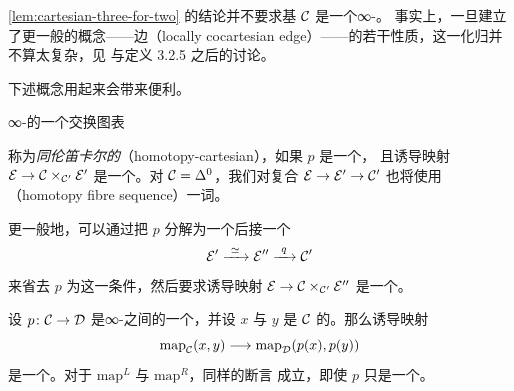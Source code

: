 \begin{remark}\label{rem:cartesian-three-for-two-base}
\cref{lem:cartesian-three-for-two} 的结论并不要求基 $\mathcal{C}$ 是一个∞-\trCategory{}。
事实上，一旦建立了更一般的概念——\trLocallyCocartesian{}边（locally
cocartesian edge）——的若干性质，这一化归并不算太复杂，见 \cite[2.4.2]{Lur09} 与定义 3.2.5 之后的讨论。
\end{remark}

下述概念用起来会带来便利。

\begin{definition}\label{def:cartesian-fibration}
∞-\trCategories{}的一个交换图表
\begin{center}
\end{center}
称为\emph{同伦笛卡尔的}（homotopy-cartesian），如果 $p$ 是一个\trIsofibration{}，
且诱导映射 $\mathcal{E} \to \mathcal{C} \times_{\mathcal{C}'} \mathcal{E}'$ 是一个\trJoyalEquivalence{}。对
$\mathcal{C} = \Delta^0$，我们对复合 $\mathcal{E} \to \mathcal{E}' \to \mathcal{C}'$ 也将使用%
\emph{\trHomotopy{}\trFibreSequence{}}（homotopy fibre sequence）一词。
\end{definition}

\begin{remark}\label{rem:homotopy-cartesian-drop-isofibration}
更一般地，可以通过把 $p$ 分解为一个\trJoyalEquivalence{}后接一个%
\trIsofibration{}%
\[
\E' \xrightarrow{\ \simeq\ } \E'' \xrightarrow{\ q\ } \C'
\]
来省去 $p$ 为\trIsofibration{}这一条件，然后要求诱导映射
$\mathcal{E} \to \mathcal{C} \times_{\mathcal{C}'} \mathcal{E}''$ 是一个\trJoyalEquivalence{}。
\end{remark}

\begin{lemma}\label{lem:isofibration-mapping-space-kan}
设 $p\colon \mathcal{C} \to \mathcal{D}$ 是∞-\trCategories{}之间的一个\trIsofibration{}，并设 $x$
与 $y$ 是 $\mathcal{C}$ 的\trObject{}。那么诱导映射
\[
\mathrm{map}_{\mathcal{C}}(x, y) \longrightarrow \mathrm{map}_{\mathcal{D}}(p(x), p(y))
\]
是一个\trKanFibration{}。对于 $\mathrm{map}^L$ 与 $\mathrm{map}^R$，同样的断言
成立，即使 $p$ 只是一个\trInnerFibration{}。
\end{lemma}

